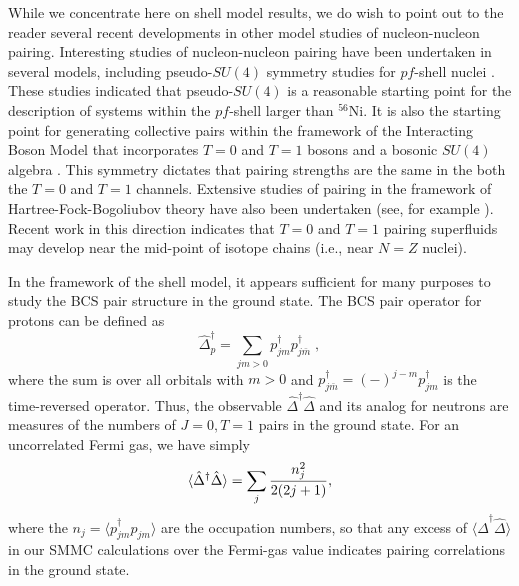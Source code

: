 \documentclass[rmp,aps,floatfix]{revtex4}
\begin{document}
While we concentrate here on shell model results, 
we do wish to point out to the reader several recent developments
in other model studies of nucleon-nucleon pairing.
Interesting studies of nucleon-nucleon pairing have been undertaken
in several models, including pseudo-$SU(4)$ symmetry studies for 
$pf$-shell nuclei \cite{isacker99}. These studies indicated that 
pseudo-$SU(4)$ is a reasonable starting point 
for the description of systems within the 
$pf$-shell larger than $^{56}$Ni. It is also the 
starting point for generating collective pairs within the framework 
of the Interacting Boson Model  that incorporates $T=0$ and 
$T=1$ bosons and a bosonic $SU(4)$ algebra \cite{elliott58}.
This symmetry dictates that pairing strengths are the 
same in the both the $T=0$ and $T=1$ channels. Extensive studies 
of pairing in the framework of Hartree-Fock-Bogoliubov theory have
also been undertaken (see, for example \cite{goodman00}). Recent 
work in this direction indicates that $T=0$ and $T=1$ pairing 
superfluids may develop near the mid-point of isotope chains (i.e., 
near $N=Z$ nuclei). 

In the framework of the shell model,
it appears sufficient for many purposes to study the BCS pair structure
in the ground state. 
The BCS pair operator for protons can be defined as
\begin{equation}
\hat{\Delta}^\dagger_p= \sum_{jm > 0} p^\dagger_{jm} p^\dagger_{j\bar m} \;,
\label{eqn_7}
\end{equation}
where the sum is over all orbitals with $m>0$ and
$p^{\dagger}_{j\bar{m}}=(-)^{j-m}p^{\dagger}_{jm}$ is the time-reversed
operator.
Thus, the observable
$\hat{\Delta}^\dagger \hat{\Delta}$
and its analog for neutrons are measures of the numbers of $J=0,T=1$ pairs in
the ground state. For an uncorrelated Fermi gas, we have simply
\begin{equation}
\langle \hat{\Delta}^\dagger \hat{\Delta} \rangle
= \sum_j {n_j^2 \over {2 (2j+1)}},
\label{eqn_8}
\end{equation}
where the $n_j= \langle p^\dagger_{jm} p_{jm} \rangle$
are the occupation numbers, so that any
excess of $\langle \hat \Delta^\dagger \hat \Delta \rangle$
in our SMMC calculations
over the Fermi-gas value indicates pairing correlations in
the ground state.
\end{document}

